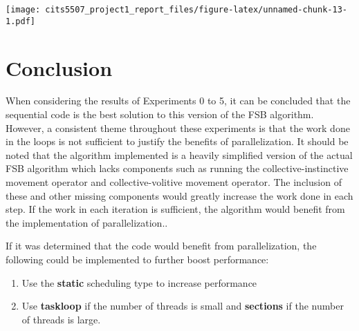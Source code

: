 \documentclass[
]{article}
\begin{document}
\texttt{[image: cits5507\_project1\_report\_files/figure-latex/unnamed-chunk-13-1.pdf]}

\hypertarget{conclusion}{%
\section{Conclusion}\label{conclusion}}

When considering the results of Experiments 0 to 5, it can be concluded
that the sequential code is the best solution to this version of the FSB
algorithm. However, a consistent theme throughout these experiments is
that the work done in the loops is not sufficient to justify the
benefits of parallelization. It should be noted that the algorithm
implemented is a heavily simplified version of the actual FSB algorithm
which lacks components such as running the collective-instinctive
movement operator and collective-volitive movement operator. The
inclusion of these and other missing components would greatly increase
the work done in each step. If the work in each iteration is sufficient,
the algorithm would benefit from the implementation of parallelization..

If it was determined that the code would benefit from parallelization,
the following could be implemented to further boost performance:

\begin{enumerate}
\def\labelenumi{\arabic{enumi}.}
\item
  Use the \textbf{static} scheduling type to increase performance
\item
  Use \textbf{taskloop} if the number of threads is small and
  \textbf{sections} if the number of threads is large.
\end{enumerate}
\end{document}
